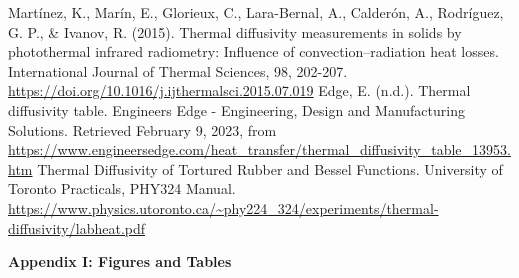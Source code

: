 \documentclass[11pt]{article}
\begin{document}
    \begin{thebibliography}{} \selectfont
         Martínez, K., Marín, E., Glorieux, C., Lara-Bernal, A., Calderón, A., Rodríguez, G. P., \& Ivanov, R. (2015). Thermal diffusivity measurements in solids by photothermal infrared radiometry: Influence of convection–radiation heat losses. International Journal of Thermal Sciences, 98, 202-207.
                    \color{blue}\url{https://doi.org/10.1016/j.ijthermalsci.2015.07.019}\color{black}
         Edge, E. (n.d.). Thermal diffusivity table. Engineers Edge - Engineering, Design and Manufacturing Solutions. Retrieved February 9, 2023, from 
                    \color{blue}\url{https://www.engineersedge.com/heat_transfer/thermal_diffusivity_table_13953.htm} \color{black}
         Thermal Diffusivity of Tortured Rubber and Bessel Functions. University of Toronto Practicals, PHY324 Manual. 
                    \color{blue}\url{https://www.physics.utoronto.ca/~phy224_324/experiments/thermal-diffusivity/labheat.pdf}\color{black}
    \end{thebibliography}




    \pagebreak 



     \selectfont \textbf{Appendix I: Figures and Tables}
    
     \selectfont




\end{document}
